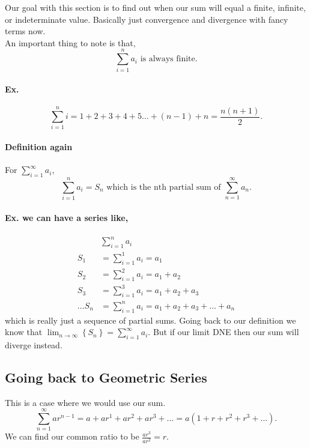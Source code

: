 \documentclass[a4paper]{article}
\begin{document}
Our goal with this section is to find out when our sum will equal a finite, infinite, or indeterminate value. Basically just convergence and divergence with fancy terms now. \\

An important thing to note is that,
\[
\sum_{ i=1 } ^{ n } a_{ i } \text{ is always finite}
.\] 

\paragraph{Ex.}
\[
\sum_{ i=1 } ^{ n } i= 1+2+3+4+5\ldots + \left( n-1 \right) + n = \frac{ n\left( n+1 \right)  }{ 2 }
.\] 

\newpage
\paragraph{Definition again\\}
For $ \sum_{ i=1 } ^{ \infty } a_i $, 
\[
\sum_{ i=1 } ^{ n } a_i = S_n \text{ which is the nth partial sum of }\sum_{ n=1 } ^{ \infty } a_n
.\] 

\paragraph{Ex. we can have a series like,}
\begin{align*}
&\sum_{ i=1 } ^{ n } a_i \\
S_1 &= \sum_{ i=1 } ^{ 1 } a_i = a_1 \\
S_2 &= \sum_{ i=1 } ^{ 2 } a_i = a_1 + a_2 \\
S_3 &= \sum_{ i=1 } ^{ 3 } a_i = a_1 + a_2 + a_3 \\
\ldots
S_n &= \sum_{ i=1 } ^{ n } a_i = a_1 + a_2 + a_3 + \ldots + a_n
\end{align*}
which is really just a sequence of partial sums. Going back to our definition we know that $ \lim_{ n \to \infty} \left\{ S_n \right\} =\sum_{ i=1 } ^{ \infty } a_i $. But if our limit DNE then our sum will diverge instead. 

\subsection{Going back to Geometric Series}%
\label{sub:Going back to Geometric Series}

This is a case where we would use our sum.
\[
\sum_{ n=1 } ^{ \infty } ar^{ n-1 }=a + ar^{ 1 } + ar^{ 2 } + ar^{ 3 } + \ldots = a\left( 1+r+r^{ 2 }+r^{ 3 }+\ldots \right)
.\] 
We can find our common ratio to be $ \frac{ ar^3 }{ ar^2 }=r $.\\
\end{document}
